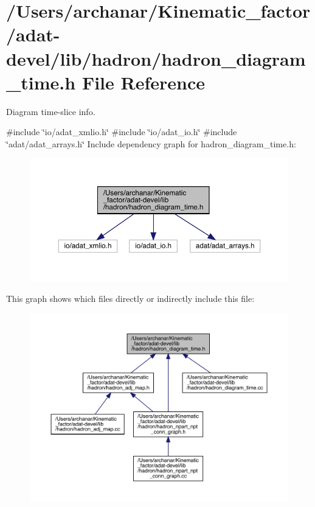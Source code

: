 \hypertarget{adat-devel_2lib_2hadron_2hadron__diagram__time_8h}{}\section{/\+Users/archanar/\+Kinematic\+\_\+factor/adat-\/devel/lib/hadron/hadron\+\_\+diagram\+\_\+time.h File Reference}
\label{adat-devel_2lib_2hadron_2hadron__diagram__time_8h}


Diagram time-\/slice info.  


{\ttfamily \#include \char`\"{}io/adat\+\_\+xmlio.\+h\char`\"{}}\newline
{\ttfamily \#include \char`\"{}io/adat\+\_\+io.\+h\char`\"{}}\newline
{\ttfamily \#include \char`\"{}adat/adat\+\_\+arrays.\+h\char`\"{}}\newline
Include dependency graph for hadron\+\_\+diagram\+\_\+time.\+h\+:
\nopagebreak
\begin{figure}[H]
\begin{center}
\leavevmode
\includegraphics[width=350pt]{db/d2d/adat-devel_2lib_2hadron_2hadron__diagram__time_8h__incl}
\end{center}
\end{figure}
This graph shows which files directly or indirectly include this file\+:
\nopagebreak
\begin{figure}[H]
\begin{center}
\leavevmode
\includegraphics[width=350pt]{de/d30/adat-devel_2lib_2hadron_2hadron__diagram__time_8h__dep__incl}
\end{center}
\end{figure}

